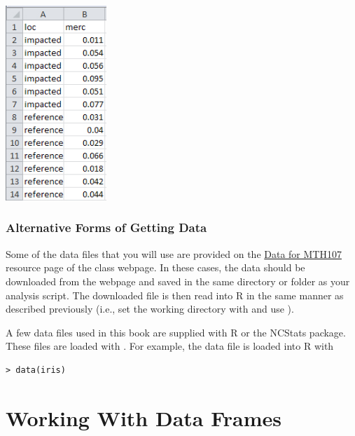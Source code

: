 \documentclass[10pt,openany]{book}\usepackage[]{graphicx}\usepackage[]{color}
\makeatletter
\newenvironment{kframe}{%
 \def\at@end@of@kframe{}%
 \ifinner\ifhmode%
  \def\at@end@of@kframe{\end{minipage}}%
  \begin{minipage}{\columnwidth}%
 \fi\fi%
 \def\FrameCommand##1{\hskip\@totalleftmargin \hskip-\fboxsep
 \colorbox{shadecolor}{##1}\hskip-\fboxsep
     \hskip-\linewidth \hskip-\@totalleftmargin \hskip\columnwidth}%
 \MakeFramed {\advance\hsize-\width
   \@totalleftmargin\z@ \linewidth\hsize
   \@setminipage}}%
 {\par\unskip\endMakeFramed%
 \at@end@of@kframe}
\newenvironment{knitrout}{}{} %
\makeatother
\begin{document}
\begin{center}
  \includegraphics[width=1.5in]{Figs/StackedData.jpg}
\end{center}


\subsubsection*{Alternative Forms of Getting Data} \label{sect:RAltData}
Some of the data files that you will use are provided on the \href{http://derekogle.com/NCMTH107/resources/data_107}{Data for MTH107} resource page of the class webpage.  In these cases, the data should be downloaded from the webpage and saved in the same directory or folder as your analysis script.  The downloaded file is then read into R in the same manner as described previously (i.e., set the working directory with  and use ).

A few data files used in this book are supplied with R or the NCStats package.  These files are loaded with .  For example, the  data file is loaded into R with
\begin{knitrout}
\color{fgcolor}\begin{kframe}
\begin{verbatim}
> data(iris)
\end{verbatim}
\end{kframe}
\end{knitrout}


\section{Working With Data Frames}  \label{sect:RWorkdf}
\end{document}
